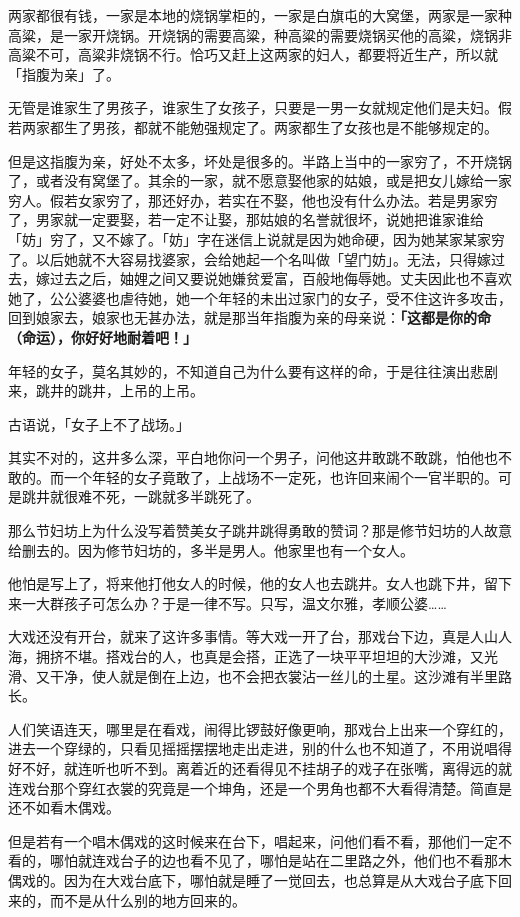 \documentclass[UTF8]{ctexart}
\begin{document}
两家都很有钱，一家是本地的烧锅掌柜的，一家是白旗屯的大窝堡，两家是一家种高粱，是一家开烧锅。开烧锅的需要高粱，种高粱的需要烧锅买他的高粱，烧锅非高粱不可，高粱非烧锅不行。恰巧又赶上这两家的妇人，都要将近生产，所以就「指腹为亲」了。

无管是谁家生了男孩子，谁家生了女孩子，只要是一男一女就规定他们是夫妇。假若两家都生了男孩，都就不能勉强规定了。两家都生了女孩也是不能够规定的。

但是这指腹为亲，好处不太多，坏处是很多的。半路上当中的一家穷了，不开烧锅了，或者没有窝堡了。其余的一家，就不愿意娶他家的姑娘，或是把女儿嫁给一家穷人。假若女家穷了，那还好办，若实在不娶，他也没有什么办法。若是男家穷了，男家就一定要娶，若一定不让娶，那姑娘的名誉就很坏，说她把谁家谁给「妨」穷了，又不嫁了。「妨」字在迷信上说就是因为她命硬，因为她某家某家穷了。以后她就不大容易找婆家，会给她起一个名叫做「望门妨」。无法，只得嫁过去，嫁过去之后，妯娌之间又要说她嫌贫爱富，百般地侮辱她。丈夫因此也不喜欢她了，公公婆婆也虐待她，她一个年轻的未出过家门的女子，受不住这许多攻击，回到娘家去，娘家也无甚办法，就是那当年指腹为亲的母亲说：\textbf{「这都是你的命（命运），你好好地耐着吧！」}

年轻的女子，莫名其妙的，不知道自己为什么要有这样的命，于是往往演出悲剧来，跳井的跳井，上吊的上吊。

古语说，「女子上不了战场。」

其实不对的，这井多么深，平白地你问一个男子，问他这井敢跳不敢跳，怕他也不敢的。而一个年轻的女子竟敢了，上战场不一定死，也许回来闹个一官半职的。可是跳井就很难不死，一跳就多半跳死了。

那么节妇坊上为什么没写着赞美女子跳井跳得勇敢的赞词？那是修节妇坊的人故意给删去的。因为修节妇坊的，多半是男人。他家里也有一个女人。

他怕是写上了，将来他打他女人的时候，他的女人也去跳井。女人也跳下井，留下来一大群孩子可怎么办？于是一律不写。只写，温文尔雅，孝顺公婆……

大戏还没有开台，就来了这许多事情。等大戏一开了台，那戏台下边，真是人山人海，拥挤不堪。搭戏台的人，也真是会搭，正选了一块平平坦坦的大沙滩，又光滑、又干净，使人就是倒在上边，也不会把衣裳沾一丝儿的土星。这沙滩有半里路长。

人们笑语连天，哪里是在看戏，闹得比锣鼓好像更响，那戏台上出来一个穿红的，进去一个穿绿的，只看见摇摇摆摆地走出走进，别的什么也不知道了，不用说唱得好不好，就连听也听不到。离着近的还看得见不挂胡子的戏子在张嘴，离得远的就连戏台那个穿红衣裳的究竟是一个坤角，还是一个男角也都不大看得清楚。简直是还不如看木偶戏。

但是若有一个唱木偶戏的这时候来在台下，唱起来，问他们看不看，那他们一定不看的，哪怕就连戏台子的边也看不见了，哪怕是站在二里路之外，他们也不看那木偶戏的。因为在大戏台底下，哪怕就是睡了一觉回去，也总算是从大戏台子底下回来的，而不是从什么别的地方回来的。
\end{document}
